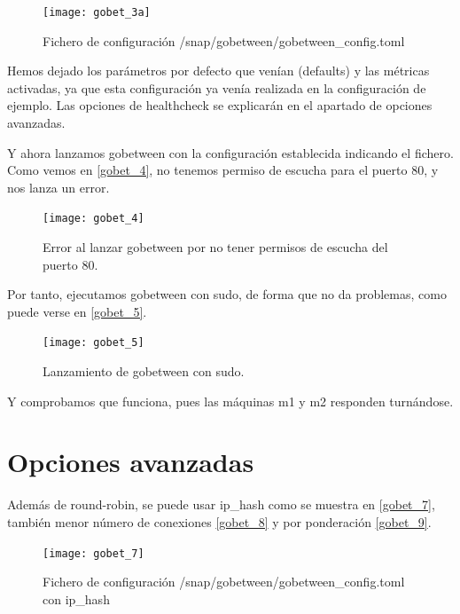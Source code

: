 \begin{figure}[h!]
\begin{center}
\caption{Fichero de configuración /snap/gobetween/gobetween\_config.toml }
\label{gobet_3}
\texttt{[image: gobet\_3a]}
\end{center}
\end{figure}

Hemos dejado los parámetros por defecto que venían (defaults) y las métricas activadas, ya que esta configuración ya venía realizada en la configuración de ejemplo. Las opciones de healthcheck se explicarán en el apartado de opciones avanzadas.

Y ahora lanzamos gobetween con la configuración establecida indicando el fichero. Como vemos en \eqref{gobet_4}, no tenemos permiso de escucha para el puerto 80, y nos lanza un error.

\begin{figure}[h!]
\begin{center}
\caption{Error al lanzar gobetween por no tener permisos de escucha del puerto 80.}
\label{gobet_4}
\texttt{[image: gobet\_4]}
\end{center}
\end{figure}

Por tanto, ejecutamos gobetween con sudo, de forma que no da problemas, como puede verse en \eqref{gobet_5}.

\begin{figure}[h!]
\begin{center}
\caption{Lanzamiento de gobetween con sudo.}
\label{gobet_5}
\texttt{[image: gobet\_5]}
\end{center}
\end{figure}

Y comprobamos que funciona, pues las máquinas m1 y m2 responden turnándose.

\section{Opciones avanzadas}

Además de round-robin, se puede usar ip\_hash como se muestra en \eqref{gobet_7}, también menor número de conexiones \eqref{gobet_8} y por ponderación \eqref{gobet_9}.

\begin{figure}[h!]
\begin{center}
\caption{Fichero de configuración /snap/gobetween/gobetween\_config.toml con ip\_hash}
\label{gobet_7}
\texttt{[image: gobet\_7]}
\end{center}
\end{figure}

